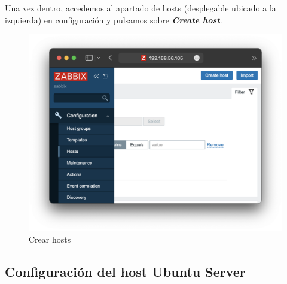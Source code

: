 Una vez dentro, accedemos al apartado de hosts (desplegable ubicado a la izquierda) en configuración y pulsamos sobre \textbf{\emph{Create host}}.
    \begin{figure}[H]
        \centering
        \includegraphics[scale=0.4]{images/zabbix_hosts.png}
        \caption{Crear hosts}
        \label{fig:zabbix_hosts}
    \end{figure}

\subsection{Configuración del host Ubuntu Server}
